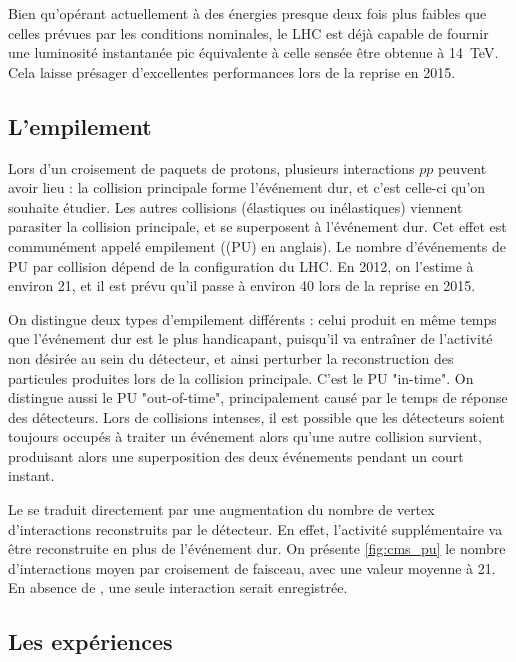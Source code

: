 \bigskip

Bien qu'opérant actuellement à des énergies presque deux fois plus faibles que celles prévues par les conditions nominales, le LHC est déjà capable de fournir une luminosité instantanée pic équivalente à celle sensée être obtenue à \SI{14}{\TeV}. Cela laisse présager d'excellentes performances lors de la reprise en 2015.

\subsection{L'empilement} \label{sec:pileup}

Lors d'un croisement de paquets de protons, plusieurs interactions $pp$ peuvent avoir lieu : la collision principale forme l'événement dur, et c'est celle-ci qu'on souhaite étudier. Les autres collisions (élastiques ou inélastiques) viennent parasiter la collision principale, et se superposent à l'événement dur. Cet effet est communément appelé empilement (\pu (PU) en anglais). Le nombre d'événements de PU par collision dépend de la configuration du LHC. En 2012, on l'estime à environ 21, et il est prévu qu'il passe à environ 40 lors de la reprise en 2015.

\medskip

On distingue deux types d'empilement différents : celui produit en même temps que l'événement dur est le plus handicapant, puisqu'il va entraîner de l'activité non désirée au sein du détecteur, et ainsi perturber la reconstruction des particules produites lors de la collision principale. C'est le PU "in-time". On distingue aussi le PU "out-of-time", principalement causé par le temps de réponse des détecteurs. Lors de collisions intenses, il est possible que les détecteurs soient toujours occupés à traiter un événement alors qu'une autre collision survient, produisant alors une superposition des deux événements pendant un court instant.

\medskip

Le \pu se traduit directement par une augmentation du nombre de vertex d'interactions reconstruits par le détecteur. En effet, l'activité supplémentaire va être reconstruite en plus de l'événement dur. On présente \cref{fig:cms_pu} le nombre d'interactions moyen par croisement de faisceau, avec une valeur moyenne à 21. En absence de \pu, une seule interaction serait enregistrée.

\subsection{Les expériences}

